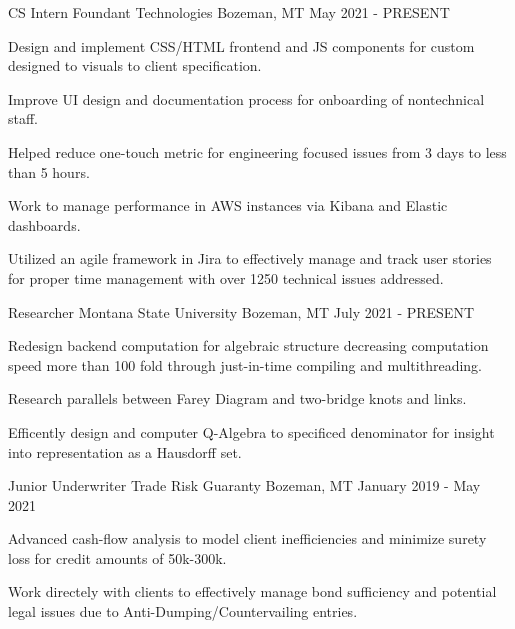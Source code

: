 
\begin{cventries}
  \cventry
      {CS Intern}
      {Foundant Technologies}
      {Bozeman, MT}
      {May 2021 - PRESENT}
      {
        \begin{cvitems}
          \item {Design and implement CSS/HTML frontend and JS components for custom designed to visuals to client specification.}
          \item {Improve UI design and documentation process for onboarding of nontechnical staff.}
          \item {Helped reduce one-touch metric for engineering focused issues from 3 days to less than 5 hours.}
          \item {Work to manage performance in AWS instances via Kibana and Elastic dashboards.}
          \item {Utilized an agile framework in Jira to effectively manage and track user stories for proper time management with over 1250 technical issues addressed.}
        \end{cvitems}  
      }
  \cventry
    {Researcher} %
    {Montana State University} %
    {Bozeman, MT} %
    {July 2021 - PRESENT} %
    {
      \begin{cvitems} %
        \item {Redesign backend computation for algebraic structure decreasing computation speed more than 100 fold through just-in-time compiling and multithreading.}
        \item {Research parallels between Farey Diagram and two-bridge knots and links.}
        \item {Efficently design and computer Q-Algebra to specificed denominator for insight into representation as a Hausdorff set.}
      \end{cvitems}
    }
  \cventry
        {Junior Underwriter}
        {Trade Risk Guaranty}
        {Bozeman, MT}
        {January 2019 - May 2021}
        {
          \begin{cvitems}
            \item {Advanced cash-flow analysis to model client inefficiencies and minimize surety loss for credit amounts of 50k-300k.}
            \item {Work directely with clients to effectively manage bond sufficiency and potential legal issues due to Anti-Dumping/Countervailing entries.}
          \end{cvitems}
        } 
\end{cventries}
